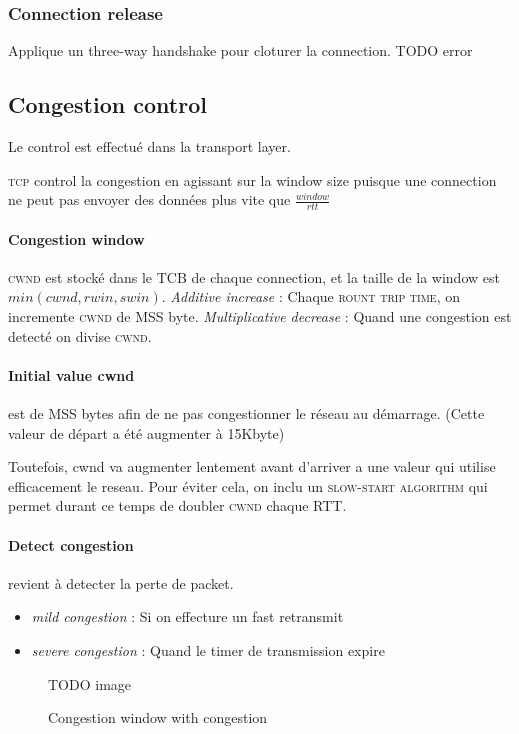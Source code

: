 \subsubsection{Connection release}
Applique un three-way handshake pour cloturer la connection.
TODO error

\subsection{Congestion control}
Le control est effectué dans la transport layer.

\textsc{tcp} control la congestion en agissant sur la window size puisque une connection
ne peut pas envoyer des données plus vite que $\frac{window}{rtt}$

\paragraph{Congestion window}
\textsc{cwnd} est stocké dans le \textsc{TCB} de chaque connection, et la taille de la window
est $min(cwnd, rwin, swin)$.  \textit{Additive increase} : Chaque \textsc{rount trip time}, on incremente \textsc{cwnd} de MSS byte. \textit{Multiplicative decrease} : Quand une congestion
est detecté on divise \textsc{cwnd}.

\paragraph{Initial value cwnd}
est de MSS bytes afin de ne pas congestionner le réseau au démarrage.
(Cette valeur de départ a été augmenter à 15Kbyte)


Toutefois, cwnd va augmenter lentement avant d'arriver a une valeur qui utilise efficacement le
reseau. Pour éviter cela, on inclu un \textsc{slow-start algorithm} qui permet durant ce temps
de doubler \textsc{cwnd} chaque RTT.

\paragraph{Detect congestion} revient à detecter la perte de packet.
\begin{itemize}
    \item \textit{mild congestion} : Si on effecture un fast retransmit
    \item \textit{severe congestion} : Quand le timer de transmission expire
\end{itemize}

\begin{figure}
    TODO image
   \caption{Congestion window with congestion}
\end{figure}

